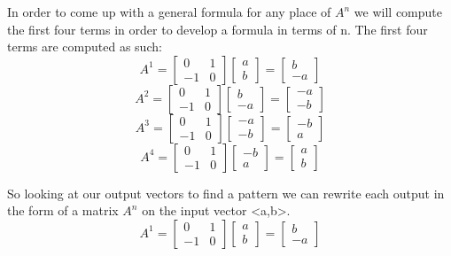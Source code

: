 \documentclass[12pt]{article}
\begin{document}
In order to come up with a general formula for any place of $A^{n}$ we will compute the first four terms in order to develop a formula in terms of n. The first four terms are computed as such:
\[
A^{1} =
\begin{bmatrix}
0 & 1\\
-1 & 0
\end{bmatrix}
\begin{bmatrix}
a\\
b
\end{bmatrix}
=
\begin{bmatrix}
b\\
-a
\end{bmatrix}
\]
\[
A^{2} =
\begin{bmatrix}
0 & 1\\
-1 & 0
\end{bmatrix}
\begin{bmatrix}
b\\
-a
\end{bmatrix}
=
\begin{bmatrix}
-a\\
-b
\end{bmatrix}
\]
\[
A^{3} =
\begin{bmatrix}
0 & 1\\
-1 & 0
\end{bmatrix}
\begin{bmatrix}
-a\\
-b
\end{bmatrix}
=
\begin{bmatrix}
-b\\
a
\end{bmatrix}
\]
\[
A^{4} = 
\begin{bmatrix}
0 & 1\\
-1 & 0
\end{bmatrix}
\begin{bmatrix}
-b\\
a
\end{bmatrix}
=
\begin{bmatrix}
a\\
b
\end{bmatrix}
\]

So looking at our output vectors to find a pattern we can rewrite each output in the form of a matrix $A^{n}$ on the input vector <a,b>.
\[
A^{1} =
\begin{bmatrix}
0 & 1\\
-1 & 0
\end{bmatrix}
\begin{bmatrix}
a\\
b
\end{bmatrix}
=
\begin{bmatrix}
b\\
-a
\end{bmatrix}
\]
\end{document}
